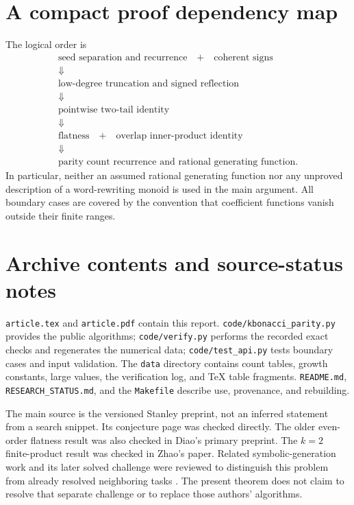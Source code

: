 \documentclass[11pt]{article}
\numberwithin{equation}{section}
\theoremstyle{definition}
\theoremstyle{remark}
\begin{document}
\section{A compact proof dependency map}
The logical order is
\[
\begin{gathered}
\text{seed separation and recurrence}\quad+\quad\text{coherent signs}\\
\Downarrow\\
\text{low-degree truncation and signed reflection}\\
\Downarrow\\
\text{pointwise two-tail identity}\\
\Downarrow\\
\text{flatness}\quad+\quad\text{overlap inner-product identity}\\
\Downarrow\\
\text{parity count recurrence and rational generating function}.
\end{gathered}
\]
In particular, neither an assumed rational generating function nor any
unproved description of a word-rewriting monoid is used in the main
argument. All boundary cases are covered by the convention that coefficient
functions vanish outside their finite ranges.

\section{Archive contents and source-status notes}
\texttt{article.tex} and \texttt{article.pdf} contain this report.
\texttt{code/kbonacci\_parity.py} provides the public algorithms;
\texttt{code/verify.py} performs the recorded exact checks and regenerates
the numerical data; \texttt{code/test\_api.py} tests boundary cases and input validation. The \texttt{data} directory contains count tables,
growth constants, large values, the verification log, and TeX table
fragments. \texttt{README.md}, \texttt{RESEARCH\_STATUS.md}, and the
\texttt{Makefile} describe use, provenance, and rebuilding.

The main source is the versioned Stanley preprint, not an inferred
statement from a search snippet. Its conjecture page was checked directly.
The older even-order flatness result was also checked in Diao's primary
preprint. The $k=2$ finite-product result was checked in Zhao's paper.
Related symbolic-generation work and its later solved challenge were
reviewed to distinguish this problem from already resolved neighboring
tasks \cite{EkhadZeilberger,TangXin}. The present theorem does not claim
to resolve that separate challenge or to replace those authors' algorithms.
\end{document}
